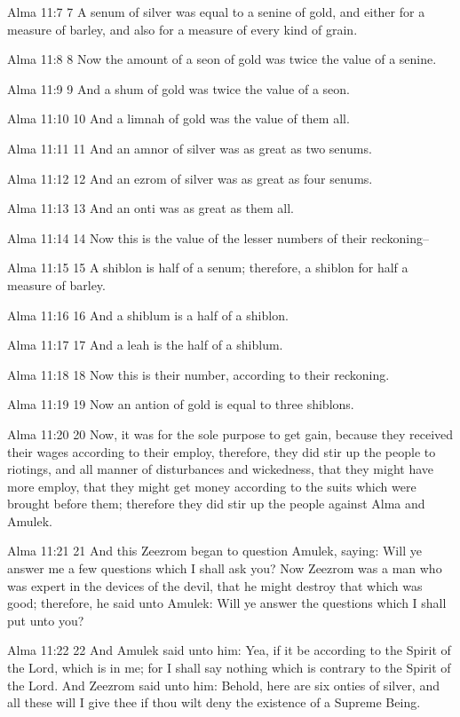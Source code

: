 Alma 11:7
 7 A senum of silver was equal to a senine of gold, and either
for a measure of barley, and also for a measure of every kind of
grain.

Alma 11:8
 8 Now the amount of a seon of gold was twice the value of a
senine.

Alma 11:9
 9 And a shum of gold was twice the value of a seon.

Alma 11:10
 10 And a limnah of gold was the value of them all.

Alma 11:11
 11 And an amnor of silver was as great as two senums.

Alma 11:12
 12 And an ezrom of silver was as great as four senums.

Alma 11:13
 13 And an onti was as great as them all.

Alma 11:14
 14 Now this is the value of the lesser numbers of their
reckoning--

Alma 11:15
 15 A shiblon is half of a senum; therefore, a shiblon for half a
measure of barley.

Alma 11:16
 16 And a shiblum is a half of a shiblon.

Alma 11:17
 17 And a leah is the half of a shiblum.

Alma 11:18
 18 Now this is their number, according to their reckoning.

Alma 11:19
 19 Now an antion of gold is equal to three shiblons.

Alma 11:20
 20 Now, it was for the sole purpose to get gain, because they
received their wages according to their employ, therefore, they
did stir up the people to riotings, and all manner of
disturbances and wickedness, that they might have more employ,
that they might get money according to the suits which were
brought before them; therefore they did stir up the people
against Alma and Amulek.

Alma 11:21
 21 And this Zeezrom began to question Amulek, saying: Will ye
answer me a few questions which I shall ask you? Now Zeezrom was
a man who was expert in the devices of the devil, that he might
destroy that which was good; therefore, he said unto Amulek: Will
ye answer the questions which I shall put unto you?

Alma 11:22
 22 And Amulek said unto him: Yea, if it be according to the
Spirit of the Lord, which is in me; for I shall say nothing which
is contrary to the Spirit of the Lord. And Zeezrom said unto
him: Behold, here are six onties of silver, and all these will I
give thee if thou wilt deny the existence of a Supreme Being.

